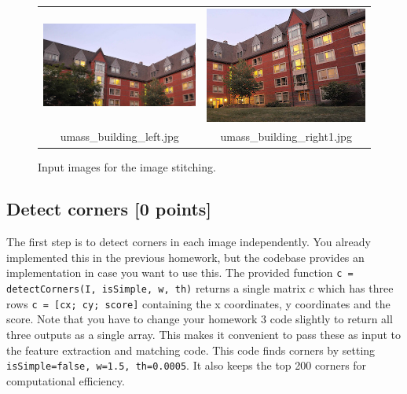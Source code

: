 \documentclass[10pt,letterpaper]{article}
\newcommand{\cmd}[1] {{\color{blue}\texttt{#1}}}
\begin{document}
\begin{figure}[h]
\centering
\begin{tabular}{cc}
\includegraphics[scale=0.5]{../data/umass_building_left.jpg}&
\includegraphics[scale=0.5]{../data/umass_building_right1.jpg} \\
umass\_building\_left.jpg & umass\_building\_right1.jpg 
\end{tabular}
\caption{\label{fig:examples} Input images for the image stitching.}
\end{figure} 

\subsection{Detect corners [0 points]}
The first step is to detect corners in each image independently. You already implemented this in the previous homework, but the codebase provides an implementation in case you want to use this. The provided function \cmd{c = detectCorners(I, isSimple, w, th)} returns a single matrix $c$ which has three rows \cmd{c = [cx; cy; score]} containing the x coordinates, y coordinates and the score. Note that you have to change your homework 3 code slightly to return all three outputs as a single array. This makes it convenient to pass these as input to the feature extraction and matching code. This code finds corners by setting \cmd{isSimple=false, w=1.5, th=0.0005}. It also keeps the top 200 corners for computational efficiency.
\end{document}
